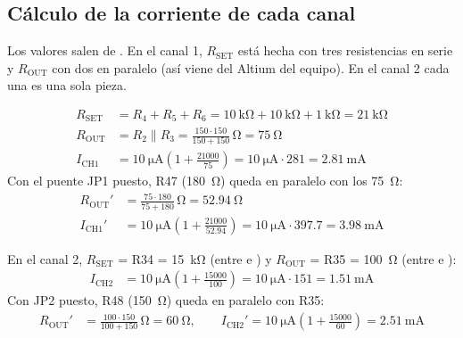 \subsection{Cálculo de la corriente de cada canal}

Los valores salen de . En el canal 1, $R_{\mathrm{SET}}$ está hecha con tres resistencias en
serie y $R_{\mathrm{OUT}}$ con dos en paralelo (así viene del Altium del equipo). En el canal 2 cada una es una sola
pieza.

\begin{calculo}
\begin{align*}
  R_{\mathrm{SET}} &= R_4 + R_5 + R_6 = \SI{10}{\kilo\ohm} + \SI{10}{\kilo\ohm} + \SI{1}{\kilo\ohm} = \SI{21}{\kilo\ohm}\\
  R_{\mathrm{OUT}} &= R_2 \parallel R_3 = \frac{150\cdot 150}{150+150}\,\si{\ohm} = \SI{75}{\ohm}\\
  I_{\mathrm{CH1}} &= \SI{10}{\micro\ampere}\left(1 + \frac{21000}{75}\right) = \SI{10}{\micro\ampere}\cdot 281
                    = \boxed{\SI{2.81}{\milli\ampere}}
\end{align*}
Con el puente JP1 puesto, R47 (\SI{180}{\ohm}) queda en paralelo con los \SI{75}{\ohm}:
\begin{align*}
  R_{\mathrm{OUT}}' &= \frac{75\cdot 180}{75+180}\,\si{\ohm} = \SI{52.94}{\ohm}\\
  I_{\mathrm{CH1}}' &= \SI{10}{\micro\ampere}\left(1 + \frac{21000}{52.94}\right) = \SI{10}{\micro\ampere}\cdot 397.7
                     = \boxed{\SI{3.98}{\milli\ampere}}
\end{align*}
\end{calculo}

\begin{calculo}
En el canal 2, $R_{\mathrm{SET}}$ = R34 = \SI{15}{\kilo\ohm} (entre  e ) y
$R_{\mathrm{OUT}}$ = R35 = \SI{100}{\ohm} (entre  e ):
\begin{align*}
  I_{\mathrm{CH2}} &= \SI{10}{\micro\ampere}\left(1 + \frac{15000}{100}\right) = \SI{10}{\micro\ampere}\cdot 151
                    = \boxed{\SI{1.51}{\milli\ampere}}
\end{align*}
Con JP2 puesto, R48 (\SI{150}{\ohm}) queda en paralelo con R35:
\begin{align*}
  R_{\mathrm{OUT}}' &= \frac{100\cdot 150}{100+150}\,\si{\ohm} = \SI{60}{\ohm}, \qquad
  I_{\mathrm{CH2}}' = \SI{10}{\micro\ampere}\left(1 + \frac{15000}{60}\right) = \boxed{\SI{2.51}{\milli\ampere}}
\end{align*}
\end{calculo}

